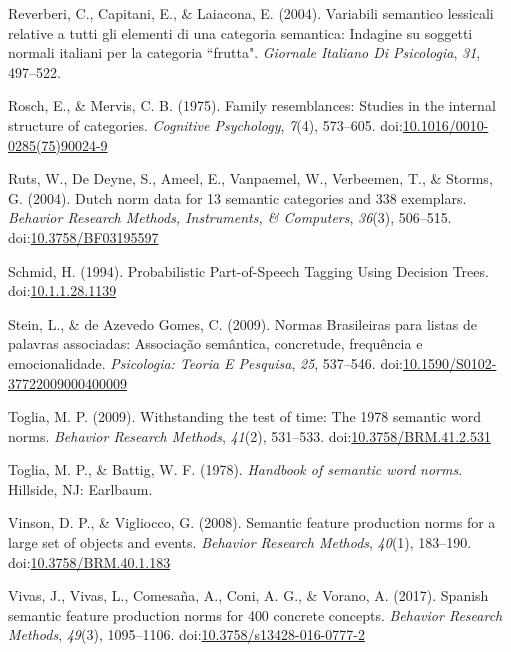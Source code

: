 \documentclass[man]{apa6}
\begin{document}
\leavevmode\hypertarget{ref-Reverberi2004}{}%
Reverberi, C., Capitani, E., \& Laiacona, E. (2004). Variabili semantico lessicali relative a tutti gli elementi di una categoria semantica: Indagine su soggetti normali italiani per la categoria ``frutta". \emph{Giornale Italiano Di Psicologia}, \emph{31}, 497--522.

\leavevmode\hypertarget{ref-Rosch1975}{}%
Rosch, E., \& Mervis, C. B. (1975). Family resemblances: Studies in the internal structure of categories. \emph{Cognitive Psychology}, \emph{7}(4), 573--605. doi:\href{https://doi.org/10.1016/0010-0285(75)90024-9}{10.1016/0010-0285(75)90024-9}

\leavevmode\hypertarget{ref-Ruts2004}{}%
Ruts, W., De Deyne, S., Ameel, E., Vanpaemel, W., Verbeemen, T., \& Storms, G. (2004). Dutch norm data for 13 semantic categories and 338 exemplars. \emph{Behavior Research Methods, Instruments, \& Computers}, \emph{36}(3), 506--515. doi:\href{https://doi.org/10.3758/BF03195597}{10.3758/BF03195597}

\leavevmode\hypertarget{ref-Schmid1994}{}%
Schmid, H. (1994). Probabilistic Part-of-Speech Tagging Using Decision Trees. doi:\href{https://doi.org/10.1.1.28.1139}{10.1.1.28.1139}

\leavevmode\hypertarget{ref-Stein2009}{}%
Stein, L., \& de Azevedo Gomes, C. (2009). Normas Brasileiras para listas de palavras associadas: Associação semântica, concretude, frequência e emocionalidade. \emph{Psicologia: Teoria E Pesquisa}, \emph{25}, 537--546. doi:\href{https://doi.org/10.1590/S0102-37722009000400009}{10.1590/S0102-37722009000400009}

\leavevmode\hypertarget{ref-Toglia2009}{}%
Toglia, M. P. (2009). Withstanding the test of time: The 1978 semantic word norms. \emph{Behavior Research Methods}, \emph{41}(2), 531--533. doi:\href{https://doi.org/10.3758/BRM.41.2.531}{10.3758/BRM.41.2.531}

\leavevmode\hypertarget{ref-Toglia1978}{}%
Toglia, M. P., \& Battig, W. F. (1978). \emph{Handbook of semantic word norms}. Hillside, NJ: Earlbaum.

\leavevmode\hypertarget{ref-Vinson2008}{}%
Vinson, D. P., \& Vigliocco, G. (2008). Semantic feature production norms for a large set of objects and events. \emph{Behavior Research Methods}, \emph{40}(1), 183--190. doi:\href{https://doi.org/10.3758/BRM.40.1.183}{10.3758/BRM.40.1.183}

\leavevmode\hypertarget{ref-Vivas2017}{}%
Vivas, J., Vivas, L., Comesaña, A., Coni, A. G., \& Vorano, A. (2017). Spanish semantic feature production norms for 400 concrete concepts. \emph{Behavior Research Methods}, \emph{49}(3), 1095--1106. doi:\href{https://doi.org/10.3758/s13428-016-0777-2}{10.3758/s13428-016-0777-2}
\end{document}
